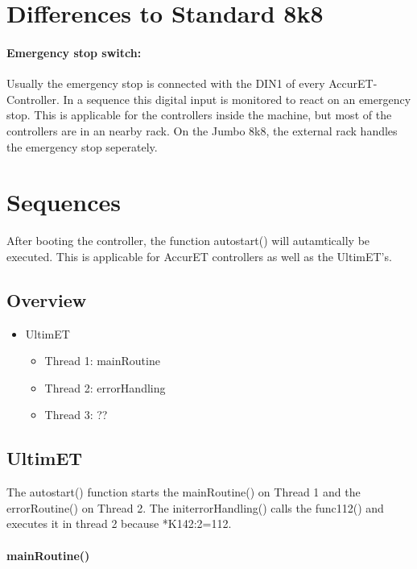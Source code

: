\documentclass[a4paper, 12pt]{article}
\newcommand{\colBox}[1]{\colorbox{gray!20}{\textcolor{green!50!black}{#1}}}
\begin{document}
	\section{Differences to Standard 8k8}
		\paragraph{Emergency stop switch:} Usually the emergency stop is connected with the DIN1 of every AccurET-Controller. In a sequence this digital input is monitored to react on an emergency stop. This is applicable for the controllers inside the machine, but most of the controllers are in an nearby rack. On the Jumbo 8k8, the external rack handles the emergency stop seperately. 
		
	\section{Sequences}
		After booting the controller, the function \colBox{autostart()} will autamtically be executed. This is applicable for AccurET controllers as well as the UltimET's. 
		\subsection{Overview}
			\begin{itemize}
				\item UltimET
				\begin{itemize}
					\item Thread 1: mainRoutine
					\item Thread 2: errorHandling
					\item Thread 3: ??
				\end{itemize}
			\end{itemize}
		\subsection{UltimET}
			The \colBox{autostart()} function starts the \colBox{mainRoutine()} on Thread 1 and the \colBox{errorRoutine()} on Thread 2.
			The initerrorHandling() calls the func112() and executes it in thread 2 because *K142:2=112.
			\paragraph{mainRoutine()}
				
%
%
%
\end{document}
